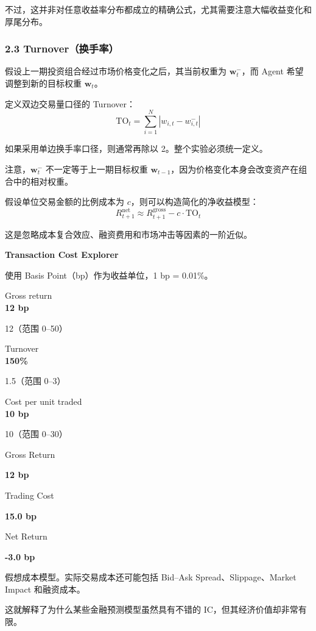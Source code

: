 不过，这并非对任意收益率分布都成立的精确公式，尤其需要注意大幅收益变化和厚尾分布。

\hypertarget{part-4-67-0001-turnoverux6362ux624bux7387}{%
\subsubsection{2.3 Turnover（换手率）}\label{part-4-67-0001-turnoverux6362ux624bux7387}}

假设上一期投资组合经过市场价格变化之后，其当前权重为 \(\boldsymbol w_t^-\)，而 Agent 希望调整到新的目标权重 \(\boldsymbol w_t\)。

定义双边交易量口径的 Turnover：
\[\boxed{
\mathrm{TO}_t
=
\sum_{i=1}^{N}|w_{i,t}-w_{i,t}^-|
}\]

如果采用单边换手率口径，则通常再除以 2。整个实验必须统一定义。

注意，\(\boldsymbol w_t^-\) 不一定等于上一期目标权重 \(\boldsymbol w_{t-1}\)，因为价格变化本身会改变资产在组合中的相对权重。

假设单位交易金额的比例成本为 \(c\)，则可以构造简化的净收益模型：
\[\boxed{
R_{t+1}^{\mathrm{net}}
\approx
R_{t+1}^{\mathrm{gross}}
-c\cdot\mathrm{TO}_t
}\]

这是忽略成本复合效应、融资费用和市场冲击等因素的一阶近似。

\textbf{Transaction Cost Explorer}

使用 Basis Point（bp）作为收益单位，1 bp = 0.01\%。

Gross return\\
\textbf{12 bp}

12（范围 0--50）

Turnover\\
\textbf{150\%}

1.5（范围 0--3）

Cost per unit traded\\
\textbf{10 bp}

10（范围 0--30）

Gross Return

\textbf{12 bp}

Trading Cost

\textbf{15.0 bp}

Net Return

\textbf{-3.0 bp}

假想成本模型。实际交易成本还可能包括 Bid--Ask Spread、Slippage、Market Impact 和融资成本。

这就解释了为什么某些金融预测模型虽然具有不错的 IC，但其经济价值却非常有限。


